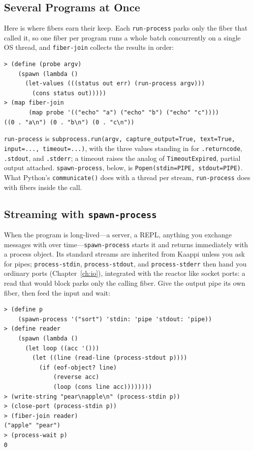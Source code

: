 \subsection{Several Programs at Once}

Here is where fibers earn their keep. Each \texttt{run-process} parks only the fiber that called it, so one fiber per program runs a whole batch concurrently on a single OS thread, and \texttt{fiber-join} collects the results in order:

\begin{lstlisting}[style=repl]
> (define (probe argv)
    (spawn (lambda ()
      (let-values (((status out err) (run-process argv)))
        (cons status out)))))
> (map fiber-join
       (map probe '(("echo" "a") ("echo" "b") ("echo" "c"))))
((0 . "a\n") (0 . "b\n") (0 . "c\n"))
\end{lstlisting}

\begin{note}
\texttt{run-process} is \texttt{subprocess.run(argv, capture\_output=True, text=True, input=..., timeout=...)}, with the three values standing in for \texttt{.returncode}, \texttt{.stdout}, and \texttt{.stderr}; a timeout raises the analog of \texttt{TimeoutExpired}, partial output attached. \texttt{spawn-process}, below, is \texttt{Popen(stdin=PIPE, stdout=PIPE)}. What Python's \texttt{communicate()} does with a thread per stream, \texttt{run-process} does with fibers inside the call.
\end{note}

\subsection{Streaming with \texttt{spawn-process}}

When the program is long-lived---a server, a REPL, anything you exchange messages with over time---\texttt{spawn-process} starts it and returns immediately with a process object. Its standard streams are inherited from Kaappi unless you ask for pipes; \texttt{process-stdin}, \texttt{process-stdout}, and \texttt{process-stderr} then hand you ordinary ports (Chapter~\ref{ch:io}), integrated with the reactor like socket ports: a read that would block parks only the calling fiber. Give the output pipe its own fiber, then feed the input and wait:

\begin{lstlisting}[style=repl]
> (define p
    (spawn-process '("sort") 'stdin: 'pipe 'stdout: 'pipe))
> (define reader
    (spawn (lambda ()
      (let loop ((acc '()))
        (let ((line (read-line (process-stdout p))))
          (if (eof-object? line)
              (reverse acc)
              (loop (cons line acc))))))))
> (write-string "pear\napple\n" (process-stdin p))
> (close-port (process-stdin p))
> (fiber-join reader)
("apple" "pear")
> (process-wait p)
0
\end{lstlisting}

